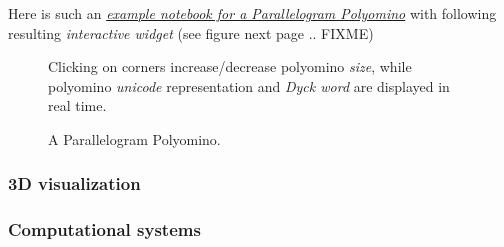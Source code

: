 \documentclass{deliverablereport}
\begin{document}
Here is such an \href{https://github.com/nheir/sage-combinat-widgets/blob/example_parapolyomino/examples/ParalleloPolyomino.ipynb}{\emph{example notebook for a Parallelogram Polyomino}} with following resulting \emph{interactive widget} (see figure next page .. FIXME)

\begin{figure}[ht]
  \caption*{A Parallelogram Polyomino.}
  \medskip
  \small{Clicking on corners increase/decrease polyomino \emph{size}, while polyomino \emph{unicode} representation and \emph{Dyck word} are displayed in real time.}
\end{figure}

\subsubsection{3D visualization}

\subsubsection{Computational systems}
\end{document}
